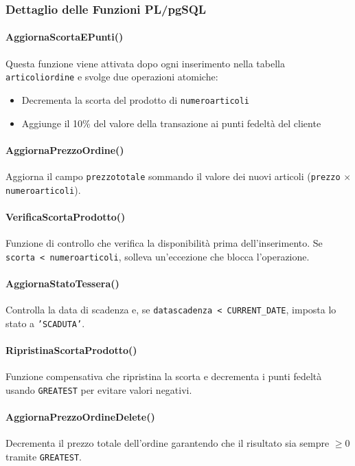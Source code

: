 \documentclass[a4paper,12pt]{article}
\begin{document}
\vspace{1em}

\subsubsection*{Dettaglio delle Funzioni PL/pgSQL}

\paragraph{AggiornaScortaEPunti()}
Questa funzione viene attivata dopo ogni inserimento nella tabella \texttt{articoliordine} e svolge due operazioni atomiche:
\begin{itemize}
    \item Decrementa la scorta del prodotto di \texttt{numeroarticoli}
    \item Aggiunge il 10\% del valore della transazione ai punti fedeltà del cliente
\end{itemize}

\paragraph{AggiornaPrezzoOrdine()}
Aggiorna il campo \texttt{prezzototale} sommando il valore dei nuovi articoli (\texttt{prezzo} $\times$ \texttt{numeroarticoli}).

\paragraph{VerificaScortaProdotto()}
Funzione di controllo che verifica la disponibilità prima dell'inserimento. Se \texttt{scorta < numeroarticoli}, solleva un'eccezione che blocca l'operazione.

\paragraph{AggiornaStatoTessera()}
Controlla la data di scadenza e, se \texttt{datascadenza < CURRENT\_DATE}, imposta lo stato a \texttt{'SCADUTA'}.

\paragraph{RipristinaScortaProdotto()}
Funzione compensativa che ripristina la scorta e decrementa i punti fedeltà usando \texttt{GREATEST} per evitare valori negativi.

\paragraph{AggiornaPrezzoOrdineDelete()}
Decrementa il prezzo totale dell'ordine garantendo che il risultato sia sempre $\geq 0$ tramite \texttt{GREATEST}.
\end{document}
